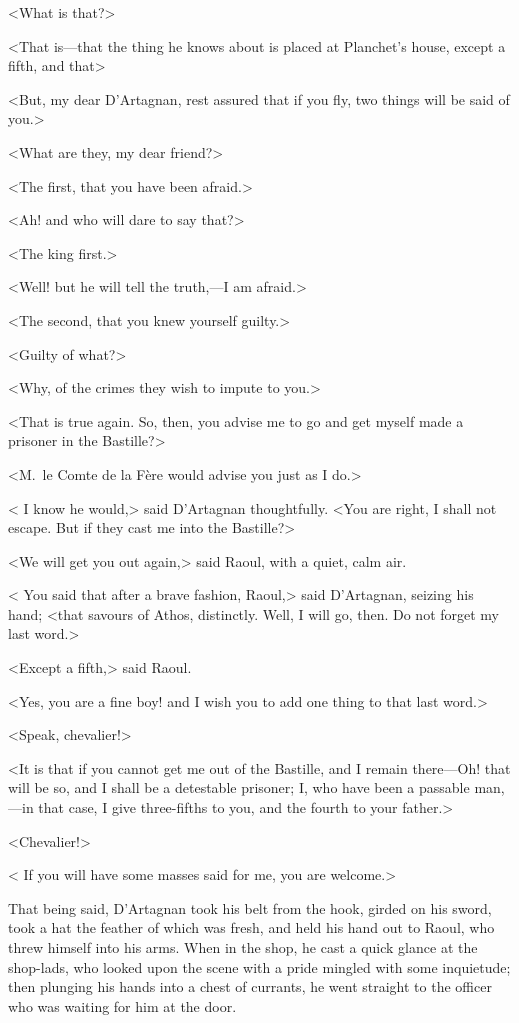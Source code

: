 <What is that?>

<That is—that the thing he knows about is placed at Planchet's house, except a fifth, and that\longdash>

<But, my dear D'Artagnan, rest assured that if you fly, two things will be said of you.>

<What are they, my dear friend?>

<The first, that you have been afraid.>

<Ah! and who will dare to say that?>

<The king first.>

<Well! but he will tell the truth,—I am afraid.>

<The second, that you knew yourself guilty.>

<Guilty of what?>

<Why, of the crimes they wish to impute to you.>

<That is true again. So, then, you advise me to go and get myself made a prisoner in the Bastille?>

<M.~le Comte de la Fère would advise you just as I do.>

< I know he would,> said D'Artagnan thoughtfully. <You are right, I shall not escape. But if they cast me into the Bastille?>

<We will get you out again,> said Raoul, with a quiet, calm air.

< You said that after a brave fashion, Raoul,> said D'Artagnan, seizing his hand; <that savours of Athos, distinctly. Well, I will go, then. Do not forget my last word.>

<Except a fifth,> said Raoul.

<Yes, you are a fine boy! and I wish you to add one thing to that last word.>

<Speak, chevalier!>

<It is that if you cannot get me out of the Bastille, and I remain there—Oh! that will be so, and I shall be a detestable prisoner; I, who have been a passable man,—in that case, I give three-fifths to you, and the fourth to your father.>

<Chevalier!>

< If you will have some masses said for me, you are welcome.>

That being said, D'Artagnan took his belt from the hook, girded on his sword, took a hat the feather of which was fresh, and held his hand out to Raoul, who threw himself into his arms. When in the shop, he cast a quick glance at the shop-lads, who looked upon the scene with a pride mingled with some inquietude; then plunging his hands into a chest of currants, he went straight to the officer who was waiting for him at the door.

